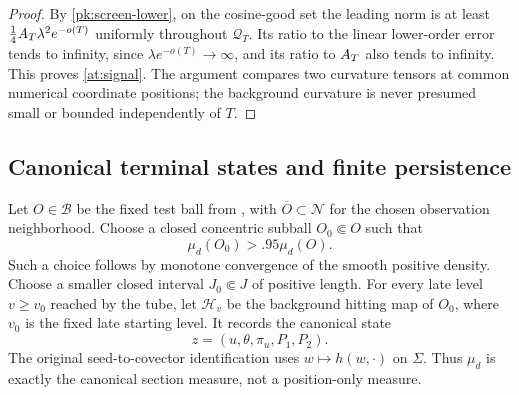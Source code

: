 \begin{proof}
By \eqref{pk:screen-lower}, on the cosine-good set the leading
norm is at least $\tfrac14A_T\lambda^2e^{-o(T)}$ uniformly
throughout $\mathcal Q_T$. Its ratio to the linear lower-order
error tends to infinity, since
$\lambda e^{-o(T)}\to\infty$, and its ratio to $A_T$ also
tends to infinity. This proves \eqref{at:signal}.
The argument compares two curvature tensors at common numerical
coordinate positions; the background curvature is never presumed
small or bounded independently of $T$.
\end{proof}

\subsection{Canonical terminal states and finite persistence}

Let $O\in\mathcal B$ be the fixed test ball from ,
with $\overline O\subset\mathcal N$ for the chosen observation neighborhood.
Choose a closed concentric subball $O_0\Subset O$ such that
\begin{equation}\label{at:trim}
 \mu_d(O_0)>.95\mu_d(O).
\end{equation}
Such a choice follows by monotone convergence of the smooth
positive density. Choose a smaller closed interval
$J_0\Subset J$ of positive length. For every late level $v\ge v_0$
reached by the tube, let $\mathcal H_v$ be the background hitting map
of $O_0$, where $v_0$ is the fixed late starting level. It records
the canonical state
\begin{equation}\label{at:terminal-state}
 z=(u,\theta,\pi_u,P_1,P_2).
\end{equation}
The original seed-to-covector identification uses $w\mapsto
h(w,\cdot)$ on $\Sigma$. Thus $\mu_d$ is exactly the canonical
section measure, not a position-only measure.


